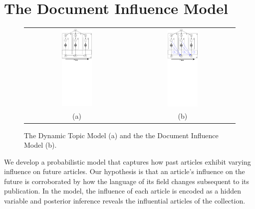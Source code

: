 \section{The Document Influence Model}
\label{section:model}

\begin{figure}
  \centering
  \begin{tabular}{cc}
    \includegraphics[width=0.3\textwidth,bb=50 500 350 800]{chapter_influence/figures/dtm_gm.pdf} &
    \includegraphics[width=0.3\textwidth,bb=-50 500 250 800]{chapter_influence/figures/docinf_gm.pdf} \\
    (a) & (b) \\
  \end{tabular}
 \label{fig:doc_influence_model}
  \caption{\label{fig:gm} The Dynamic Topic Model (a) and the the Document Influence Model (b).}
\end{figure}
We develop a probabilistic model that captures how past articles
exhibit varying influence on future articles.  Our hypothesis is that
an article's influence on the future is corroborated by how the
language of its field changes subsequent to its publication.  In the
model, the influence of each article is encoded as a hidden variable
and posterior inference reveals the influential articles of the
collection.

